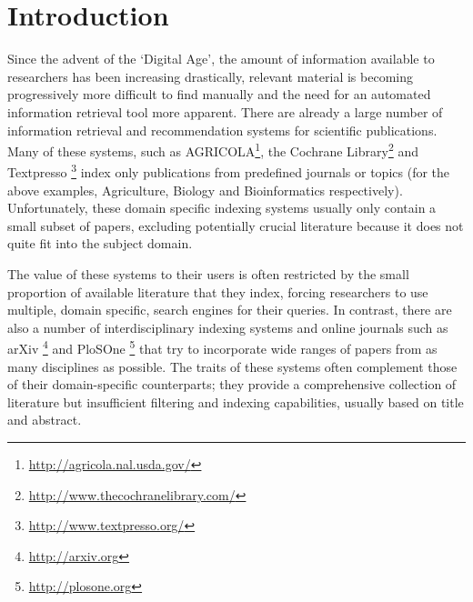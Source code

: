 \documentclass{svmult}
\begin{document}
\vspace{-15pt}
\section{Introduction} \label{sec:1}
\vspace{-11pt}
Since the advent of the `Digital Age', the amount of information available to
researchers has been increasing drastically, relevant material is becoming
progressively more difficult to find manually and the need for an automated
information retrieval tool more apparent. There are already a large number of
information retrieval and recommendation systems for scientific publications.
Many of these systems, such as AGRICOLA\footnote{\url{http://agricola.nal.usda.gov/}},
the Cochrane Library\footnote{\url{http://www.thecochranelibrary.com/}} and Textpresso
\footnote{\url{http://www.textpresso.org/}} index only publications from predefined
journals or topics (for the above examples, Agriculture, Biology and
Bioinformatics respectively).  Unfortunately, these domain specific indexing
systems usually only contain a small subset of papers, excluding potentially
crucial literature because it does not quite fit into the subject domain. 

The value of these systems to their users is often restricted by the small
proportion of available literature that they index, forcing researchers to use
multiple, domain specific, search engines for their queries.  In contrast,
there are also a number of interdisciplinary indexing systems and online
journals such as arXiv \footnote{\url{http://arxiv.org}} and PloSOne
\footnote{\url{http://plosone.org}} that try to incorporate wide ranges of
papers from as many disciplines as possible. The traits of these systems often
complement those of their domain-specific counterparts; they provide a
comprehensive collection of literature but insufficient filtering and indexing
capabilities, usually based on title and abstract. 
\end{document}
